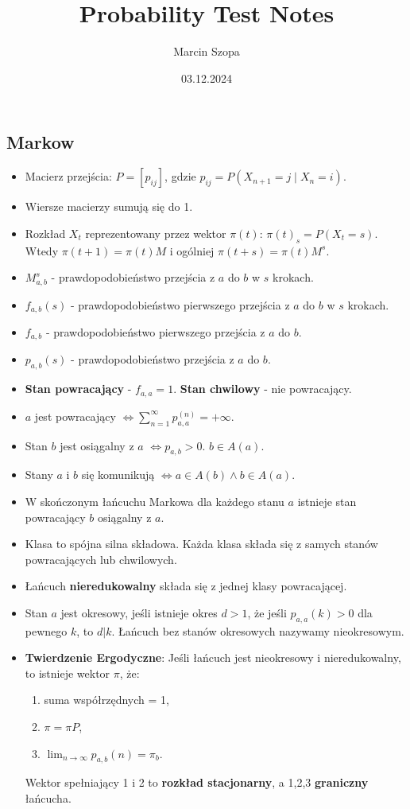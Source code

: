 \documentclass{article}
\title{Probability Test Notes}
\author{Marcin Szopa}
\date{03.12.2024}
\theoremstyle{definition}
\theoremstyle{remark}
\begin{document}
\begin{multicols}{2}
    \section*{Markow}
    \begin{itemize}[itemsep=0pt, left=0pt]
        \item Macierz przejścia: \( P = [p_{ij}] \), gdzie \( p_{ij} = P(X_{n+1} = j \mid X_n = i) \).
        \item Wiersze macierzy sumują się do 1.
        \item Rozkład \(X_t\) reprezentowany przez wektor \(\pi(t)\): \(\pi(t)_s = P(X_t = s)\). Wtedy \(\pi(t + 1) = \pi(t)M\) i ogólniej \(\pi(t + s) = \pi(t)M^s\).
        \item \(M_{a,b}^{s}\) - prawdopodobieństwo przejścia z \(a\) do \(b\) w \(s\) krokach.
        \item \(f_{a,b}(s)\) - prawdopodobieństwo pierwszego przejścia z \(a\) do \(b\) w \(s\) krokach.
        \item \(f_{a,b}\) - prawdopodobieństwo pierwszego przejścia z \(a\) do \(b\).
        \item \(p_{a,b}(s)\) - prawdopodobieństwo przejścia z \(a\) do \(b\).
        \item \textbf{Stan powracający} - \(f_{a,a} = 1\). \textbf{Stan chwilowy} - nie powracający.
        \item \(a\) jest powracający \(\iff \sum_{n=1}^{\infty} p_{a,a}^{(n)} = +\infty\).
        \item Stan \(b\) jest osiągalny z \(a\) \(\iff p_{a,b} > 0\). \(b \in A(a)\).
        \item Stany \(a\) i \(b\) się komunikują \(\iff a \in A(b) \land b \in A(a)\).
        \item W skończonym łańcuchu Markowa dla każdego stanu \(a\) istnieje stan powracający \(b\) osiągalny z \(a\).
        \item Klasa to spójna silna składowa. Każda klasa składa się z samych stanów powracających lub chwilowych.
        \item Łańcuch \textbf{nieredukowalny} składa się z jednej klasy powracającej.
        \item Stan \(a\) jest okresowy, jeśli istnieje okres \(d > 1\), że jeśli \(p_{a,a}(k) > 0\)
         dla pewnego \(k\), to \(d | k\). Łańcuch bez stanów okresowych nazywamy nieokresowym.
        
        \item \textbf{Twierdzenie Ergodyczne}: Jeśli łańcuch jest nieokresowy i nieredukowalny, to istnieje wektor \(\pi\), że:
        \begin{enumerate}[itemsep=0pt, left=0pt, topsep=0pt]
            \item suma współrzędnych = 1,
            \item \(\pi = \pi P\),
            \item \(\lim_{n \to \infty} p_{a,b}(n) = \pi_b\).
        \end{enumerate}  
        Wektor spełniający 1 i 2 to \textbf{rozkład stacjonarny}, a 1,2,3 \textbf{graniczny} łańcucha.
    \end{itemize}


\end{multicols}
\end{document}
